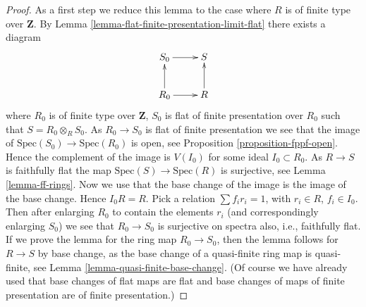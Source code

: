 \begin{proof}
As a first step we reduce this lemma to the case where $R$ is of finite
type over $\mathbf{Z}$.
By Lemma \ref{lemma-flat-finite-presentation-limit-flat} there exists a
diagram
$$
\xymatrix{
S_0 \ar[r] & S \\
R_0 \ar[u] \ar[r] & R \ar[u]
}
$$
where $R_0$ is of finite type over $\mathbf{Z}$, $S_0$ is flat of finite
presentation over $R_0$ such that $S = R_0 \otimes_R S_0$. As $R_0 \to S_0$
is flat of finite presentation we see that the image of
$\text{Spec}(S_0) \to \text{Spec}(R_0)$ is open, see
Proposition \ref{proposition-fppf-open}. Hence the complement of the image
is $V(I_0)$ for some ideal $I_0 \subset R_0$.
As $R \to S$ is faithfully
flat the map $\text{Spec}(S) \to \text{Spec}(R)$ is surjective, see
Lemma \ref{lemma-ff-rings}.
Now we use that
the base change of the image is the image of the base change.
Hence $I_0R = R$. Pick a relation
$\sum f_i r_i = 1$, with $r_i \in R$, $f_i \in I_0$. Then after
enlarging $R_0$ to contain the elements $r_i$ (and correspondingly
enlarging $S_0$) we see that $R_0 \to S_0$ is surjective on spectra
also, i.e., faithfully flat.
If we prove the lemma for the ring map $R_0 \to S_0$, then the lemma
follows for $R \to S$ by base change, as the base change of
a quasi-finite ring map is quasi-finite, see
Lemma \ref{lemma-quasi-finite-base-change}. (Of course we have
already used that base changes of flat maps are flat and
base changes of maps of finite presentation are of finite presentation.)


\end{proof}
